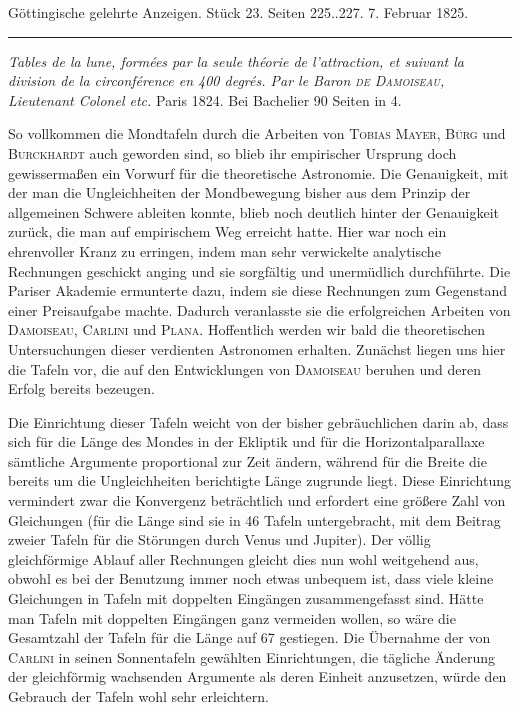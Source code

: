 \clearpage
{}
\begin{center}\small Göttingische gelehrte Anzeigen. Stück 23. Seiten 225..227. 7. Februar 1825.\\[3pt]\rule{.72\linewidth}{.3pt}\end{center}

\emph{Tables de la lune, formées par la seule théorie de l'attraction, et suivant la division de la circonférence en \textup{400} degrés. Par le Baron \textup{\textsc{de Damoiseau}}, Lieutenant Colonel etc.} Paris 1824. Bei Bachelier 90 Seiten in 4.

So vollkommen die Mondtafeln durch die Arbeiten von \textsc{Tobias Mayer}, \textsc{Bürg} und \textsc{Burckhardt} auch geworden sind, so blieb ihr empirischer Ursprung doch gewissermaßen ein Vorwurf für die theoretische Astronomie. Die Genauigkeit, mit der man die Ungleichheiten der Mondbewegung bisher aus dem Prinzip der allgemeinen Schwere ableiten konnte, blieb noch deutlich hinter der Genauigkeit zurück, die man auf empirischem Weg erreicht hatte. Hier war noch ein ehrenvoller Kranz zu erringen, indem man sehr verwickelte analytische Rechnungen geschickt anging und sie sorgfältig und unermüdlich durchführte. Die Pariser Akademie ermunterte dazu, indem sie diese Rechnungen zum Gegenstand einer Preisaufgabe machte. Dadurch veranlasste sie die erfolgreichen Arbeiten von \textsc{Damoiseau}, \textsc{Carlini} und \textsc{Plana}. Hoffentlich werden wir bald die theoretischen Untersuchungen dieser verdienten Astronomen erhalten. Zunächst liegen uns hier die Tafeln vor, die auf den Entwicklungen von \textsc{Damoiseau} beruhen und deren Erfolg bereits bezeugen.

Die Einrichtung dieser Tafeln weicht von der bisher gebräuchlichen darin ab, dass sich für die Länge des Mondes in der Ekliptik und für die Horizontalparallaxe sämtliche Argumente proportional zur Zeit ändern, während für die Breite die bereits um die Ungleichheiten berichtigte Länge zugrunde liegt. Diese Einrichtung vermindert zwar die Konvergenz beträchtlich und erfordert eine größere Zahl von Gleichungen (für die Länge sind sie in 46 Tafeln untergebracht, mit dem Beitrag zweier Tafeln für die Störungen durch Venus und Jupiter). Der völlig gleichförmige Ablauf aller Rechnungen gleicht dies nun wohl weitgehend aus, obwohl es bei der Benutzung immer noch etwas unbequem ist, dass viele kleine Gleichungen in Tafeln mit doppelten Eingängen zusammengefasst sind. Hätte man Tafeln mit doppelten Eingängen ganz vermeiden wollen, so wäre die Gesamtzahl der Tafeln für die Länge auf 67 gestiegen. Die Übernahme der von \textsc{Carlini} in seinen Sonnentafeln gewählten Einrichtungen, die tägliche Änderung der gleichförmig wachsenden Argumente als deren Einheit anzusetzen, würde den Gebrauch der Tafeln wohl sehr erleichtern.

